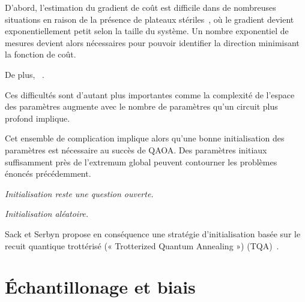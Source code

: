 D'abord, l'estimation du gradient de coût est difficile dans de nombreuses situations en raison de la présence de plateaux stériles~\cite{mccleanBarrenPlateausQuantum2018, laroccaReviewBarrenPlateaus2024}, où le gradient devient exponentiellement petit selon la taille du système. Un nombre exponentiel de mesures devient alors nécessaires pour pouvoir identifier la direction minimisant la fonction de coût.

De plus, ~\cite{bittelTrainingVariationalQuantum2021}. 

Ces difficultés sont d'autant plus importantes comme la complexité de l'espace des paramètres augmente avec le nombre de paramètres qu'un circuit plus profond implique. 

Cet ensemble de complication implique alors qu'une bonne initialisation des paramètres est nécessaire au succès de QAOA.  Des paramètres initiaux suffisamment près de l'extremum global peuvent contourner les problèmes énoncés précédemment.

\textcolor{mydarkred}{\textit{Initialisation reste une question ouverte.}}

\textcolor{mydarkred}{\textit{Initialisation aléatoire.}}

Sack et Serbyn propose en conséquence une stratégie d'initialisation basée sur le recuit quantique trottérisé (« Trotterized Quantum Annealing ») (TQA)~\cite{sackQuantumAnnealingInitialization2021}.  


\section{Échantillonage et biais}
\label{sec:echantillonage-et-biais}

